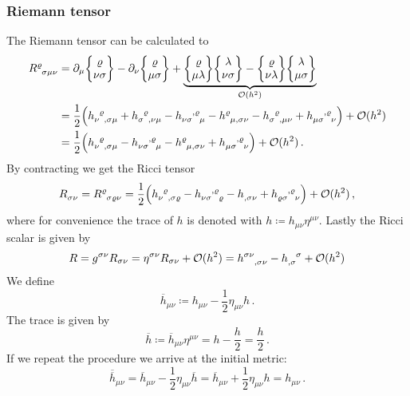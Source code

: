 \subsubsection*{Riemann tensor}
The Riemann tensor can be calculated to
\begin{equation}
    \begin{split}
        \tensor{R}{^\varrho_\sigma_\mu_\nu}
        &= \partial_\mu \cSym{\varrho}{\nu}{\sigma} - \partial_\nu \cSym{\varrho}{\mu}{\sigma}
        + \underbrace{\cSym{\varrho}{\mu}{\lambda} \cSym{\lambda}{\nu}{\sigma} - \cSym{\varrho}{\nu}{\lambda} \cSym{\lambda}{\mu}{\sigma}}_{\landauO(h^2)} \\
        &= \frac{1}{2} \left( \tensor{h}{_\nu^\varrho_,_\sigma_\mu} +
        {\tensor{h}{_\sigma^\varrho_,_\nu_\mu}} - \tensor{h}{_\nu_\sigma^,^\varrho_\mu} - \tensor{h}{^\varrho_\mu_,_\sigma_\nu} -
        {\tensor{h}{_\sigma^\varrho_,_\mu_\nu}} +
        \tensor{h}{_\mu_\sigma^,^\varrho_\nu} \right) + \landauO(h^2) \\
        &= \frac{1}{2} \left( \tensor{h}{_\nu^\varrho_,_\sigma_\mu} - \tensor{h}{_\nu_\sigma^,^\varrho_\mu}
        - \tensor{h}{^\varrho_\mu_,_\sigma_\nu} +
        \tensor{h}{_\mu_\sigma^,^\varrho_\nu} \right) + \landauO(h^2) \, .
    \end{split}
\end{equation}
By contracting we get the Ricci tensor
\begin{equation}
    \tensor{R}{_\sigma_\nu} = \tensor{R}{^\varrho_\sigma_\varrho_\nu}
    = \frac{1}{2} \left( \tensor{h}{_\nu^\varrho_,_\sigma_\varrho} - \tensor{h}{_\nu_\sigma^,^\varrho_\varrho}
    - \tensor{h}{_,_\sigma_\nu} + \tensor{h}{_\varrho_\sigma^,^\varrho_\nu} \right) + \landauO(h^2)\, ,
\end{equation}
where for convenience the trace of $h$ is denoted with $h\coloneqq
h_{\mu\nu}\eta^{\mu\nu}$. Lastly the Ricci scalar is given by
\begin{equation}
    R = g^{\sigma\nu}R_{\sigma\nu} = \eta^{\sigma\nu}R_{\sigma\nu} + \landauO(h^2)
    = \tensor{h}{^\sigma^\nu_,_\sigma_\nu} - \tensor{h}{_,_\sigma^\sigma} + \landauO(h^2)
\end{equation}
We define
\begin{equation}
    \overline{h}_{\mu\nu} \coloneqq h_{\mu\nu} - \frac{1}{2} \eta_{\mu\nu}h\,.
\end{equation}
The trace is given by
\begin{equation}
    \overline{h} \coloneqq  \overline{h}_{\mu\nu}\eta^{\mu\nu} = h -   
    \frac{h}{2} = \frac{h}{2}\,.
\end{equation}
If we repeat the procedure we arrive at the initial metric:
\begin{equation}
    \overline{\overline{h}}_{\mu\nu} = \overline{h}_{\mu\nu} - \frac{1}{2}
    \eta_{\mu\nu}\overline{h} = \overline{h}_{\mu\nu} + \frac{1}{2}
    \eta_{\mu\nu}h= h_{\mu\nu}\,.
\end{equation}
